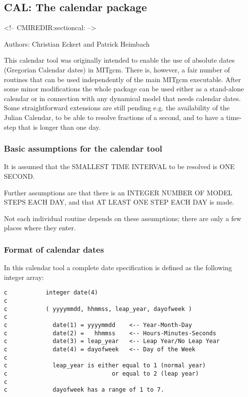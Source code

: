 \subsection{CAL: The calendar package
\label{sectioncal}}
\begin{rawhtml}
<!-- CMIREDIR:sectioncal: -->
\end{rawhtml}

Authors: Christian Eckert and Patrick Heimbach

This calendar tool was originally intended to enable the use of
absolute dates (Gregorian Calendar dates) in MITgcm. There is,
however, a fair number of routines that can be used independently of
the main MITgcm executable. After some minor modifications the whole
package can be used either as a stand-alone calendar or in connection
with any dynamical model that needs calendar dates. Some
straightforward extensions are still pending e.g. the availability of
the Julian Calendar, to be able to resolve fractions of a second, and
to have a time- step that is longer than one day.

\subsubsection{Basic assumptions for the calendar tool}

    It is assumed that the SMALLEST TIME INTERVAL to be resolved is
    ONE SECOND.

    Further assumptions are that there is an INTEGER NUMBER OF
    MODEL STEPS EACH DAY, and that AT LEAST ONE STEP EACH DAY is
    made.

    Not each individual routine depends on these assumptions; there
    are only a few places where they enter.

\subsubsection{Format of calendar dates}

    In this calendar tool a complete date specification is defined
    as the following integer array:

\begin{verbatim}
c           integer date(4)
c
c           ( yyyymmdd, hhmmss, leap_year, dayofweek )
c
c             date(1) = yyyymmdd    <-- Year-Month-Day
c             date(2) =   hhmmss    <-- Hours-Minutes-Seconds
c             date(3) = leap_year   <-- Leap Year/No Leap Year
c             date(4) = dayofweek   <-- Day of the Week
c
c             leap_year is either equal to 1 (normal year)
c                              or equal to 2 (leap year)
c
c             dayofweek has a range of 1 to 7.
\end{verbatim}

